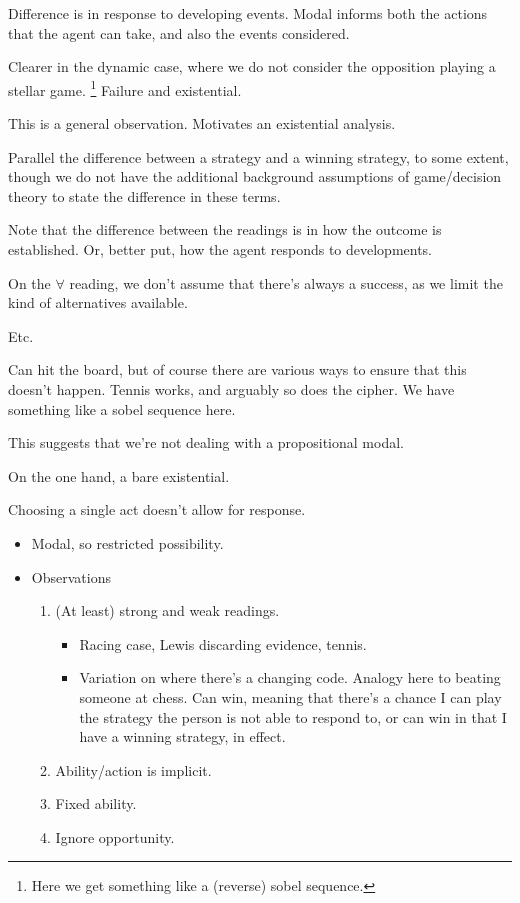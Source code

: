 \documentclass[10pt]{article}
\begin{document}
Difference is in response to developing events.
Modal informs both the actions that the agent can take, and also the events considered.

Clearer in the dynamic case, where we do not consider the opposition playing a stellar game.\nolinebreak
\footnote{
  Here we get something like a (reverse) sobel sequence.
}
Failure and existential.

This is a general observation.
Motivates an existential analysis.



Parallel the difference between a strategy and a winning strategy, to some extent, though we do not have the additional background assumptions of game/decision theory to state the difference in these terms.

Note that the difference between the readings is in how the outcome is established.
Or, better put, how the agent responds to developments.

On the \(\forall\) reading, we don't assume that there's always a success, as we limit the kind of alternatives available.

\begin{scenario}[Dart]
  Etc.\
\end{scenario}

Can hit the board, but of course there are various ways to ensure that this doesn't happen.
Tennis works, and arguably so does the cipher.
We have something like a sobel sequence here.

This suggests that we're not dealing with a propositional modal.

On the one hand, a bare existential.

Choosing a single act doesn't allow for response.





\begin{itemize}
\item Modal, so restricted possibility.
\end{itemize}

\begin{itemize}
\item Observations
  \begin{enumerate}
  \item (At least) strong and weak readings.
    \begin{itemize}
    \item Racing case, Lewis discarding evidence, tennis.
    \item Variation on \citeauthor{Schwarz:2020aa} where there's a changing code.
      Analogy here to beating someone at chess.
      Can win, meaning that there's a chance I can play the strategy the person is not able to respond to, or can win in that I have a winning strategy, in effect.
    \end{itemize}
  \item Ability/action is implicit.
  \item Fixed ability.
  \item Ignore opportunity.
  \end{enumerate}
\end{itemize}
\end{document}

